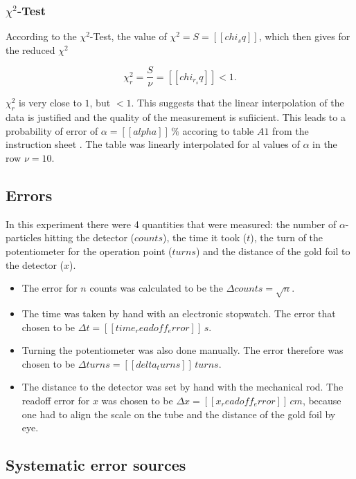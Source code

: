 \documentclass[a4paper]{article}
\begin{document}
\subsubsection{$\chi^2$-Test}

According to the $\chi^2$-Test, the value of $\chi^2 = S = [[chi_sq]]$, which then gives for the reduced $\chi^2$

\begin{equation}
\chi_r^2 = \frac{S}{\nu} = [[chi_r_sq]] < 1.
\end{equation}

$\chi_r^2$ is very close to $1$, but $<1$. This suggests that the linear interpolation of the data is justified and the quality of the measurement is sufiicient. This leads to a probability of error of $\alpha = [[alpha]] \, \%$ accoring to table $A1$ from the instruction sheet \cite{inst2007}. The table was linearly interpolated for al values of $\alpha$ in the row $\nu = 10$.

\subsection{Errors}

In this experiment there were 4 quantities that were measured: the number of $\alpha$-particles hitting the detector ($counts$), the time it took ($t$), the turn of the potentiometer for the operation point ($turns$) and the distance of the gold foil to the detector ($x$).

\begin{itemize}
\item The error for $n$ counts was calculated to be the $\Delta counts = \sqrt{n}$.
\item The time was taken by hand with an electronic stopwatch. The error that chosen to be $\Delta t = [[time_readoff_error]] \, s$.
\item Turning the potentiometer was also done manually. The error therefore was chosen to be $\Delta turns = [[delta_turns]] \, turns$.
\item The distance to the detector was set by hand with the mechanical rod. The readoff error for $x$ was chosen to be $\Delta x = [[x_readoff_error]] \, cm$, because one had to align the scale on the tube and the distance of the gold foil by eye.
\end{itemize}

\subsection{Systematic error sources}
\label{sec:systematic_errors}
\end{document}
